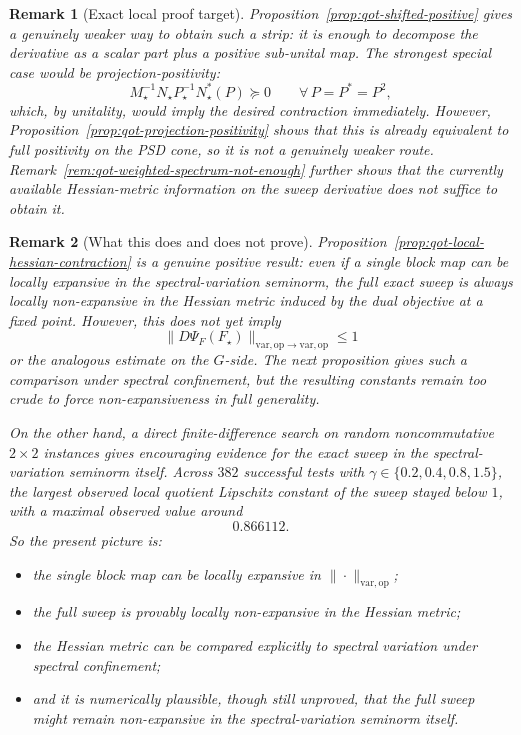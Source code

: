 \documentclass[11pt]{article}
\newcommand{\op}{\mathrm{op}}
\newcommand{\varop}{\mathrm{var},\op}
\theoremstyle{plain}
\newtheorem{remark}{Remark}[section]
\begin{document}
\begin{remark}[Exact local proof target]
Proposition~\ref{prop:qot-shifted-positive} gives a genuinely weaker way to obtain such a strip:
it is enough to decompose the derivative as a scalar part plus a positive sub-unital map.
The strongest special case would be projection-positivity:
\[
M_\star^{-1}N_\star P_\star^{-1}N_\star^\ast(P)\succeq 0
\qquad
\forall\, P=P^\ast=P^2,
\]
which, by unitality, would imply the desired contraction immediately.
However, Proposition~\ref{prop:qot-projection-positivity} shows that this is already equivalent to full positivity on the PSD cone, so it is not a genuinely weaker route.
Remark~\ref{rem:qot-weighted-spectrum-not-enough} further shows that the currently available Hessian-metric information on the sweep derivative does not suffice to obtain it.
\end{remark}

\begin{remark}[What this does and does not prove]
\label{rem:qot-hessian-vs-varop}
Proposition~\ref{prop:qot-local-hessian-contraction} is a genuine positive result: even if a single block map can be locally expansive in the spectral-variation seminorm, the \emph{full exact sweep} is always locally non-expansive in the Hessian metric induced by the dual objective at a fixed point.
However, this does \emph{not} yet imply
\[
\|D\Psi_F(F_\star)\|_{\varop \to \varop}\le 1
\]
or the analogous estimate on the $G$-side.
The next proposition gives such a comparison under spectral confinement, but the resulting constants remain too crude to force non-expansiveness in full generality.

On the other hand, a direct finite-difference search on random noncommutative $2 \times 2$ instances gives encouraging evidence for the exact sweep in the spectral-variation seminorm itself.
Across $382$ successful tests with $\gamma \in \{0.2,0.4,0.8,1.5\}$, the largest observed local quotient Lipschitz constant of the sweep stayed below $1$, with a maximal observed value around
\[
0.866112.
\]
So the present picture is:
\begin{itemize}[leftmargin=1.5em]
\item the \emph{single block map} can be locally expansive in $\|\cdot\|_{\varop}$;
\item the \emph{full sweep} is provably locally non-expansive in the Hessian metric;
\item the Hessian metric can be compared explicitly to spectral variation under spectral confinement;
\item and it is numerically plausible, though still unproved, that the full sweep might remain non-expansive in the spectral-variation seminorm itself.
\end{itemize}
\end{remark}
\end{document}
